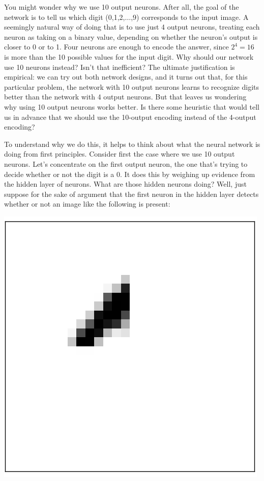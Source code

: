 \documentclass[a4paper,twoside,10pt]{book}
\begin{document}
You might wonder why we use 10 output neurons. After all, the goal of the network is to tell us which digit (0,1,2,$\ldots$,9) corresponds to the input image. A seemingly natural way of doing that is to use just 4 output neurons, treating each neuron as taking on a binary value, depending on whether the neuron's output is closer to 0 or to 1. Four neurons are enough to encode the answer, since $2^4=16$ is more than the 10 possible values for the input digit. Why should our network use 10 neurons instead? Isn't that inefficient? The ultimate justification is empirical: we can try out both network designs, and it turns out that, for this particular problem, the network with 10 output neurons learns to recognize digits better than the network with 4 output neurons. But that leaves us wondering why using 10 output neurons works better. Is there some heuristic that would tell us in advance that we should use the 10-output encoding instead of the 4-output encoding?

To understand why we do this, it helps to think about what the neural network is doing from first principles. Consider first the case where we use 10 output neurons. Let's concentrate on the first output neuron, the one that's trying to decide whether or not the digit is a 0. It does this by weighing up evidence from the hidden layer of neurons. What are those hidden neurons doing? Well, just suppose for the sake of argument that the first neuron in the hidden layer detects whether or not an image like the following is present:
\begin{center}
	\includegraphics[height=0.1\linewidth]{./figures/ch1/mnist_top_left_feature}
\end{center}
\end{document}
